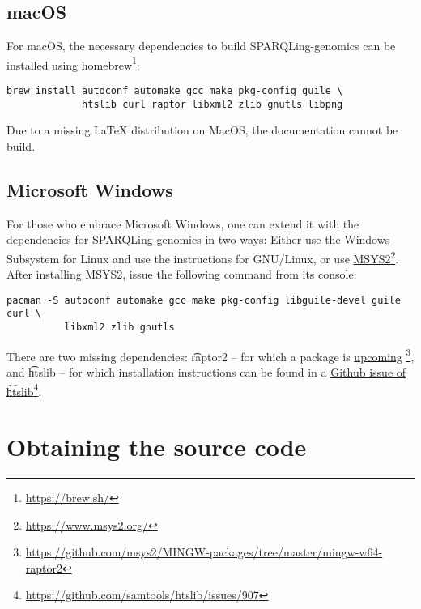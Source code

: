 \subsection{macOS}

  For macOS, the necessary dependencies to build SPARQLing-genomics
  can be installed using
  \href{https://brew.sh/}{homebrew}\footnote{\url{https://brew.sh/}}:

\begin{siderules}
\begin{verbatim}
brew install autoconf automake gcc make pkg-config guile \
             htslib curl raptor libxml2 zlib gnutls libpng
\end{verbatim}
\end{siderules}

  Due to a missing \LaTeX{} distribution on MacOS, the documentation
  cannot be build.

\subsection{Microsoft Windows}

  For those who embrace Microsoft Windows, one can extend it with the
  dependencies for SPARQLing-genomics in two ways: Either use the Windows
  Subsystem for Linux and use the instructions for GNU/Linux, or use
  \href{https://www.msys2.org/}{MSYS2}\footnote{\url{https://www.msys2.org/}}.
  After installing MSYS2, issue the following command from its console:

\begin{siderules}
\begin{verbatim}
pacman -S autoconf automake gcc make pkg-config libguile-devel guile curl \
          libxml2 zlib gnutls
\end{verbatim}
\end{siderules}

  There are two missing dependencies: \t{raptor2} -- for which a package is
  \href{https://github.com/msys2/MINGW-packages/tree/master/mingw-w64-raptor2}{upcoming}%
  \footnote{\url{https://github.com/msys2/MINGW-packages/tree/master/mingw-w64-raptor2}},
  and \t{htslib} -- for which installation instructions can be found in a
  \href{https://github.com/samtools/htslib/issues/907}{Github issue of
    \t{htslib}}\footnote{\url{https://github.com/samtools/htslib/issues/907}}.

\section{Obtaining the source code}
\label{sec:obtaining-tarball}


